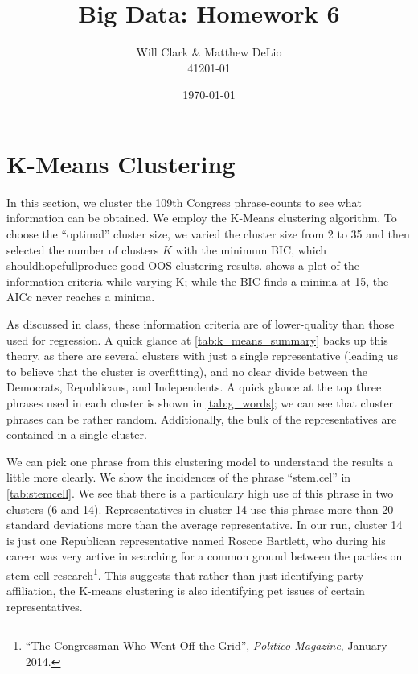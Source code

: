 \documentclass[11pt, fleqn]{article}
\begin{document}
\title{Big Data: Homework 6}
\author{Will Clark \& Matthew DeLio \\ 41201-01}
\date{\today}
\maketitle

\section{K-Means Clustering} \label{sec:kmeans}

In this section, we cluster the 109th Congress phrase-counts to see what information can be obtained.  We employ the K-Means clustering algorithm.  To choose the ``optimal'' cluster size, we varied the cluster size from 2 to 35 and then selected the number of clusters $K$ with the minimum BIC, which should\textemdash hopefull\textemdash produce good OOS clustering results.   shows a plot of the information criteria while varying K; while the BIC finds a minima at 15, the AICc never reaches a minima.

As discussed in class, these information criteria are of lower-quality than those used for regression.  A quick glance at \vref{tab:k_means_summary} backs up this theory, as there are several clusters with just a single representative (leading us to believe that the cluster is overfitting), and no clear divide between the Democrats, Republicans, and Independents.  A quick glance at the top three phrases used in each cluster is shown in \vref{tab:g_words}; we can see that cluster phrases can be rather random.  Additionally, the bulk of the representatives are contained in a single cluster.  %

We can pick one phrase from this clustering model to understand the results a little more clearly. We show the incidences of the phrase ``stem.cel'' in \vref{tab:stemcell}. We see that there is a particulary high use of this phrase in two clusters (6 and 14). Representatives in cluster 14 use this phrase more than 20 standard deviations more than the average representative. In our run, cluster 14 is just one Republican representative named Roscoe Bartlett, who during his career was very active in searching for a common ground between the parties on stem cell research\footnote{``The Congressman Who Went Off the Grid'', \textit{Politico Magazine}, January 2014.}. This suggests that rather than just identifying party affiliation, the K-means clustering is also identifying pet issues of certain representatives.
\end{document}
